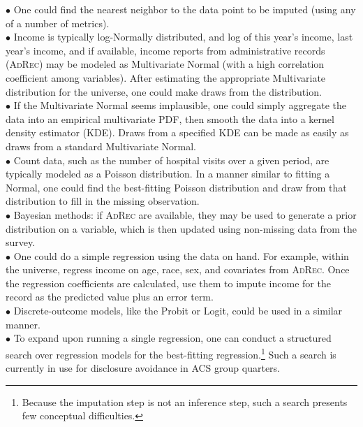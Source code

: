 \documentclass{article}
\def\adrec{\textsc{AdRec}\xspace}
\begin{document}
$\bullet$ One could find the nearest neighbor to the data point to be imputed (using any
of a number of metrics).\\

$\bullet$ Income is typically log-Normally distributed, and log of this year's income, last
year's income, and if available, income reports from administrative records (\adrec) may
be modeled as Multivariate Normal (with a high correlation
coefficient among variables). After estimating the appropriate Multivariate
distribution for the universe, one could make draws from the distribution.\\

$\bullet$ If the Multivariate Normal seems implausible, one could simply aggregate the
data into an empirical multivariate PDF, then smooth the data into a kernel
density estimator (KDE). Draws from a specified KDE can be made as easily as
draws from a standard Multivariate Normal.\\

$\bullet$ Count data, such as the number of hospital visits over a given period, are
typically modeled as a Poisson distribution. In a manner similar to fitting a Normal, one
could find the best-fitting Poisson distribution and draw from that distribution to fill
in the missing observation.\\

$\bullet$ Bayesian methods: if \adrec are available, they may be used to generate a prior distribution
on a variable, which is then updated using non-missing data from the survey.\\

$\bullet$ One could do a simple regression using the data on hand. For example,
within the universe, regress income on  age, race, sex, and covariates from \adrec.
Once the regression coefficients are calculated, use them to impute income for
the record as the predicted value plus an error term. \\

$\bullet$ Discrete-outcome models, like the Probit or Logit, could be used in a similar
manner.\\

$\bullet$ To expand upon running a single regression, one can conduct a structured search
over regression models for the best-fitting regression.\footnote{Because the imputation
step is not an inference step, such a search presents few conceptual difficulties.}
Such a search is currently in use for disclosure avoidance in ACS group quarters.\\
\end{document}
